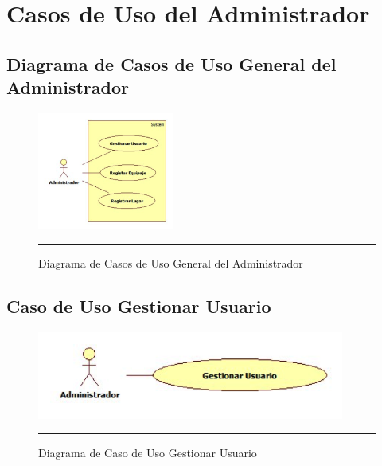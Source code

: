 \section{Casos de Uso del Administrador}

\subsection{Diagrama de Casos de Uso General del Administrador}

\begin{figure}[htbp]
	\centering
		\includegraphics[width=0.4\textwidth]{Figuras/cugeneralAdministrador.png}
		\rule{30em}{0.5pt}
	\caption[Diagrama de Casos de Uso General del Administrador]{Diagrama de Casos de Uso General del Administrador}
	\label{fig:cuGeneralAdministrador}
\end{figure}

\subsection{Caso de Uso Gestionar Usuario}

\begin{figure}[htbp]
	\centering
		\includegraphics[width=0.9\textwidth]{Figuras/cuGestionarUsuario.png}
		\rule{30em}{0.5pt}
	\caption[Diagrama de Caso de Uso Gestionar Usuario]{Diagrama de Caso de Uso Gestionar Usuario}
	\label{fig:cuGestionarUsuario}
\end{figure}

